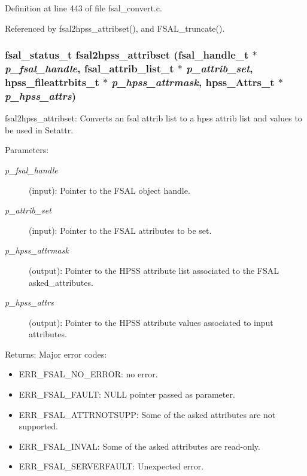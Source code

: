 Definition at line 443 of file fsal\_\-convert.c.

Referenced by fsal2hpss\_\-attribset(), and FSAL\_\-truncate().
\subsubsection[{fsal2hpss\_\-attribset}]{\setlength{\rightskip}{0pt plus 5cm}fsal\_\-status\_\-t fsal2hpss\_\-attribset (fsal\_\-handle\_\-t $\ast$ {\em p\_\-fsal\_\-handle}, \/  fsal\_\-attrib\_\-list\_\-t $\ast$ {\em p\_\-attrib\_\-set}, \/  hpss\_\-fileattrbits\_\-t $\ast$ {\em p\_\-hpss\_\-attrmask}, \/  hpss\_\-Attrs\_\-t $\ast$ {\em p\_\-hpss\_\-attrs})}\label{fsal__convert_8c_9bbaf4c4c8320ab3833f41011b854713}


fsal2hpss\_\-attribset: Converts an fsal attrib list to a hpss attrib list and values to be used in Setattr.

\begin{Desc}
\item[Parameters:]
\begin{description}
\item[{\em p\_\-fsal\_\-handle}](input): Pointer to the FSAL object handle. \item[{\em p\_\-attrib\_\-set}](input): Pointer to the FSAL attributes to be set. \item[{\em p\_\-hpss\_\-attrmask}](output): Pointer to the HPSS attribute list associated to the FSAL asked\_\-attributes. \item[{\em p\_\-hpss\_\-attrs}](output): Pointer to the HPSS attribute values associated to input attributes.\end{description}
\end{Desc}
\begin{Desc}
\item[Returns:]Major error codes:\begin{itemize}
\item ERR\_\-FSAL\_\-NO\_\-ERROR: no error.\item ERR\_\-FSAL\_\-FAULT: NULL pointer passed as parameter.\item ERR\_\-FSAL\_\-ATTRNOTSUPP: Some of the asked attributes are not supported.\item ERR\_\-FSAL\_\-INVAL: Some of the asked attributes are read-only.\item ERR\_\-FSAL\_\-SERVERFAULT: Unexpected error. \end{itemize}
\end{Desc}


